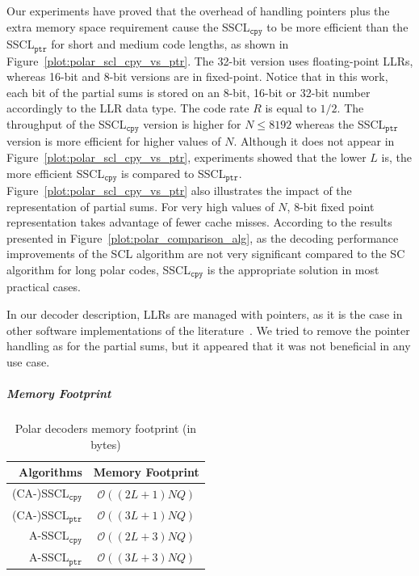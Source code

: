 Our experiments have proved that the overhead of handling pointers plus the
extra memory space requirement cause the SSCL$_{\texttt{cpy}}$ to be more
efficient than the SSCL$_{\texttt{ptr}}$ for short and medium code lengths, as
shown in Figure~\ref{plot:polar_scl_cpy_vs_ptr}. The 32-bit version uses
floating-point LLRs, whereas 16-bit and 8-bit versions are in fixed-point.
Notice that in this work, each bit of the partial sums is stored on an 8-bit,
16-bit or 32-bit number accordingly to the LLR data type. The code rate $R$ is
equal to $1/2$. The throughput of the SSCL$_{\texttt{cpy}}$ version is higher
for $N \leq 8192$ whereas the SSCL$_{\texttt{ptr}}$ version is more efficient
for higher values of $N$. Although it does not appear in
Figure~\ref{plot:polar_scl_cpy_vs_ptr}, experiments showed that the lower $L$
is, the more efficient SSCL$_{\texttt{cpy}}$ is compared to
SSCL$_{\texttt{ptr}}$. Figure~\ref{plot:polar_scl_cpy_vs_ptr} also illustrates
the impact of the representation of partial sums. For very high values of $N$,
8-bit fixed point representation takes advantage of fewer cache misses.
According to the results presented in Figure~\ref{plot:polar_comparison_alg}, as
the decoding performance improvements of the SCL algorithm are not very
significant compared to the SC algorithm for long polar codes,
SSCL$_{\texttt{cpy}}$ is the appropriate solution in most practical cases.

In our decoder description, LLRs are managed with pointers, as it is the case in
other software implementations of the
literature~\cite{Sarkis2014b,Sarkis2016,Shen2016}. We tried to remove the
pointer handling as for the partial sums, but it appeared that it was not
beneficial in any use case.

\subparagraph{Memory Footprint}

\begin{table}[t]
  \centering
  \caption{Polar decoders memory footprint (in bytes)}
  \label{tab:footprint}
   \begin{tabular}{r|c}
    \textbf{Algorithms}        & \textbf{Memory Footprint} \\
    \hline
    (CA-)SSCL$_{\texttt{cpy}}$ & $\mathcal{O}((2L + 1)NQ)$ \\
    (CA-)SSCL$_{\texttt{ptr}}$ & $\mathcal{O}((3L + 1)NQ)$ \\
    A-SSCL$_{\texttt{cpy}}$    & $\mathcal{O}((2L + 3)NQ)$ \\
    A-SSCL$_{\texttt{ptr}}$    & $\mathcal{O}((3L + 3)NQ)$ \\
  \end{tabular}
\end{table}

